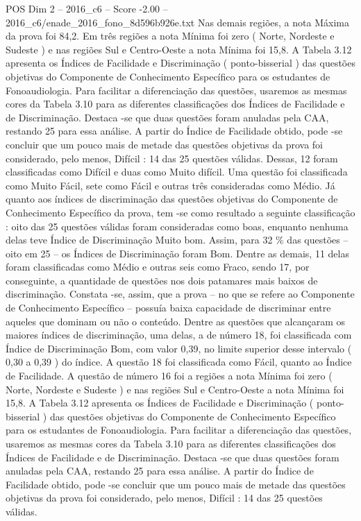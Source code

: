 \begin{textsample}{POS Dim 2 – 2016\_c6 – Score -2.00 – 2016\_c6/enade\_2016\_fono\_8d596b926e.txt}
Nas demais regiões, a nota Máxima da prova foi 84,2.
Em três regiões a nota Mínima foi zero ( Norte, Nordeste e Sudeste ) e nas regiões Sul e Centro-Oeste a nota Mínima foi 15,8.
A Tabela 3.12 apresenta os Índices de Facilidade e Discriminação ( ponto-bisserial ) das questões objetivas do Componente de Conhecimento Específico para os estudantes de Fonoaudiologia.
Para facilitar a diferenciação das questões, usaremos as mesmas cores da Tabela 3.10 para as diferentes classificações dos Índices de Facilidade e de Discriminação.
Destaca -se que duas questões foram anuladas pela CAA, restando 25 para essa análise.
A partir do Índice de Facilidade obtido, pode -se concluir que um pouco mais de metade das questões objetivas da prova foi considerado, pelo menos, Difícil : 14 das 25 questões válidas.
Dessas, 12 foram classificadas como Difícil e duas como Muito difícil.
Uma questão foi classificada como Muito Fácil, sete como Fácil e outras três consideradas como Médio.
Já quanto aos índices de discriminação das questões objetivas do Componente de Conhecimento Específico da prova, tem -se como resultado a seguinte classificação : oito das 25 questões válidas foram consideradas como boas, enquanto nenhuma delas teve Índice de Discriminação Muito bom.
Assim, para 32 \% das questões – oito em 25 – os Índices de Discriminação foram Bom.
Dentre as demais, 11 delas foram classificadas como Médio e outras seis como Fraco, sendo 17, por conseguinte, a quantidade de questões nos dois patamares mais baixos de discriminação.
Constata -se, assim, que a prova – no que se refere ao Componente de Conhecimento Específico – possuía baixa capacidade de discriminar entre aqueles que dominam ou não o conteúdo.
Dentre as questões que alcançaram os maiores índices de discriminação, uma delas, a de número 18, foi classificada com Índice de Discriminação Bom, com valor 0,39, no limite superior desse intervalo ( 0,30 a 0,39 ) do índice.
A questão 18 foi classificada como Fácil, quanto ao Índice de Facilidade.
A questão de número 16 foi a regiões a nota Mínima foi zero ( Norte, Nordeste e Sudeste ) e nas regiões Sul e Centro-Oeste a nota Mínima foi 15,8.
A Tabela 3.12 apresenta os Índices de Facilidade e Discriminação ( ponto-bisserial ) das questões objetivas do Componente de Conhecimento Específico para os estudantes de Fonoaudiologia.
Para facilitar a diferenciação das questões, usaremos as mesmas cores da Tabela 3.10 para as diferentes classificações dos Índices de Facilidade e de Discriminação.
Destaca -se que duas questões foram anuladas pela CAA, restando 25 para essa análise.
A partir do Índice de Facilidade obtido, pode -se concluir que um pouco mais de metade das questões objetivas da prova foi considerado, pelo menos, Difícil : 14 das 25 questões válidas.

\end{textsample}
